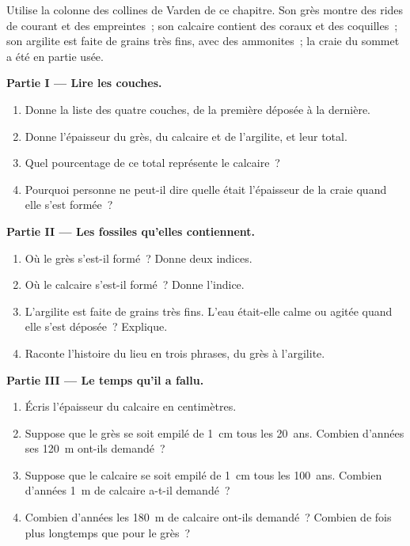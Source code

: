 \begin{problem}
\label{pb:g7:sediments-and-fossils:1}
Utilise la colonne des collines de Varden de ce chapitre. Son grès montre
des rides de courant et des empreintes~; son calcaire contient des coraux
et des coquilles~; son argilite est faite de grains très fins, avec des
ammonites~; la craie du sommet a été en partie usée.

\medskip
\noindent\textbf{Partie I --- Lire les couches.}\par\nopagebreak
\begin{enumerate}[beginpenalty=10000]
  \item Donne la liste des quatre couches, de la première déposée à la
        dernière.
  \item Donne l'épaisseur du grès, du calcaire et de l'argilite, et leur
        total.
  \item Quel pourcentage de ce total représente le calcaire~?
  \item Pourquoi personne ne peut-il dire quelle était l'épaisseur de la
        craie quand elle s'est formée~?
\end{enumerate}

\medskip
\noindent\textbf{Partie II --- Les fossiles qu'elles contiennent.}\par\nopagebreak
\begin{enumerate}[resume, beginpenalty=10000]
  \item Où le grès s'est-il formé~? Donne deux indices.
  \item Où le calcaire s'est-il formé~? Donne l'indice.
  \item L'argilite est faite de grains très fins. L'eau était-elle calme ou
        agitée quand elle s'est déposée~? Explique.
  \item Raconte l'histoire du lieu en trois phrases, du grès à l'argilite.
\end{enumerate}

\medskip
\noindent\textbf{Partie III --- Le temps qu'il a fallu.}\par\nopagebreak
\begin{enumerate}[resume, beginpenalty=10000]
  \item Écris l'épaisseur du calcaire en centimètres.
  \item Suppose que le grès se soit empilé de \qty{1}{cm} tous les 20~ans.
        Combien d'années ses \qty{120}{m} ont-ils demandé~?
  \item Suppose que le calcaire se soit empilé de \qty{1}{cm} tous les
        100~ans. Combien d'années \qty{1}{m} de calcaire a-t-il demandé~?
  \item Combien d'années les \qty{180}{m} de calcaire ont-ils demandé~?
        Combien de fois plus longtemps que pour le grès~?
\end{enumerate}
\end{problem}
